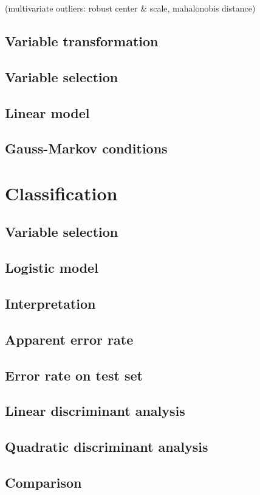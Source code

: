 \documentclass[a4paper, 12pt]{article}
\begin{document}
(multivariate outliers: robust center \& scale, mahalonobis distance)

\subsection*{Variable transformation}
\subsection*{Variable selection}
\subsection*{Linear model}
\subsection*{Gauss-Markov conditions}

\section{Classification}
\subsection*{Variable selection}
\subsection*{Logistic model}
\subsection*{Interpretation}
\subsection*{Apparent error rate}
\subsection*{Error rate on test set}
\subsection*{Linear discriminant analysis}
\subsection*{Quadratic discriminant analysis}
\subsection*{Comparison}
\end{document}
